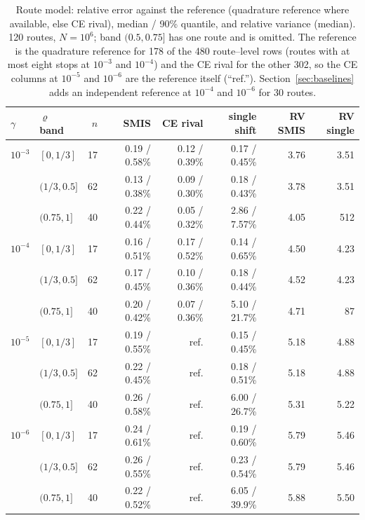 \documentclass[11pt]{article}
\theoremstyle{definition}
\theoremstyle{remark}
\begin{document}
\begin{table}[t]
\centering\small
\caption{Route model: relative error against the reference (quadrature
reference where available, else CE rival), median / 90\% quantile, and relative
variance (median). 120 routes, $N=10^6$; band $(0.5,0.75]$ has one route and
is omitted. The reference is the quadrature reference for 178 of the 480
route--level rows (routes with at most eight stops at $10^{-3}$ and $10^{-4}$)
and the CE rival for the other 302, so the CE columns at $10^{-5}$ and
$10^{-6}$ are the reference itself (``ref.''). Section~\ref{sec:baselines}
adds an independent reference at $10^{-4}$ and $10^{-6}$ for 30 routes.}
\label{tab:routes}
\begin{tabular}{llrrrrrr}
\toprule
$\gamma$ & $\varrho$ band & $n$ & SMIS & CE rival & single shift & RV SMIS & RV single \\
\midrule
$10^{-3}$ & $[0,1/3]$ & 17 & 0.19 / 0.58\% & 0.12 / 0.39\% & 0.17 / 0.45\% & 3.76 & 3.51 \\
 & $(1/3,0.5]$ & 62 & 0.13 / 0.38\% & 0.09 / 0.30\% & 0.18 / 0.43\% & 3.78 & 3.51 \\
 & $(0.75,1]$ & 40 & 0.22 / 0.44\% & 0.05 / 0.32\% & 2.86 / 7.57\% & 4.05 & 512 \\
$10^{-4}$ & $[0,1/3]$ & 17 & 0.16 / 0.51\% & 0.17 / 0.52\% & 0.14 / 0.65\% & 4.50 & 4.23 \\
 & $(1/3,0.5]$ & 62 & 0.17 / 0.45\% & 0.10 / 0.36\% & 0.18 / 0.44\% & 4.52 & 4.23 \\
 & $(0.75,1]$ & 40 & 0.20 / 0.42\% & 0.07 / 0.36\% & 5.10 / 21.7\% & 4.71 & 87 \\
$10^{-5}$ & $[0,1/3]$ & 17 & 0.19 / 0.55\% & ref. & 0.15 / 0.45\% & 5.18 & 4.88 \\
 & $(1/3,0.5]$ & 62 & 0.22 / 0.45\% & ref. & 0.18 / 0.51\% & 5.18 & 4.88 \\
 & $(0.75,1]$ & 40 & 0.26 / 0.58\% & ref. & 6.00 / 26.7\% & 5.31 & 5.22 \\
$10^{-6}$ & $[0,1/3]$ & 17 & 0.24 / 0.61\% & ref. & 0.19 / 0.60\% & 5.79 & 5.46 \\
 & $(1/3,0.5]$ & 62 & 0.26 / 0.55\% & ref. & 0.23 / 0.54\% & 5.79 & 5.46 \\
 & $(0.75,1]$ & 40 & 0.22 / 0.52\% & ref. & 6.05 / 39.9\% & 5.88 & 5.50 \\
\bottomrule
\end{tabular}
\end{table}
\end{document}
